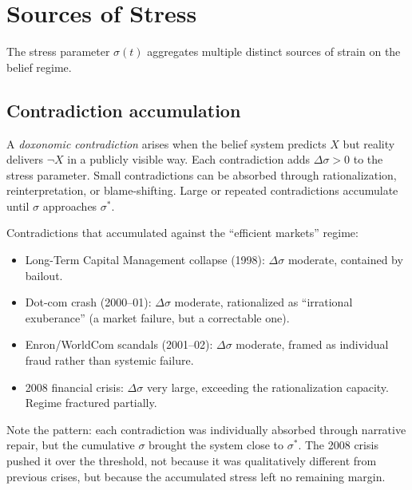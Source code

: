 \section{Sources of Stress}
\label{sec:ch30-stress}

The stress parameter $\sigma(t)$ aggregates multiple distinct sources of strain on the belief regime.

\subsection{Contradiction accumulation}

\begin{definition}
\label{def:contradiction}
A \emph{doxonomic contradiction} arises when the belief system predicts $X$ but reality delivers $\neg X$ in a publicly visible way.
Each contradiction adds $\Delta\sigma > 0$ to the stress parameter.
Small contradictions can be absorbed through rationalization, reinterpretation, or blame-shifting.
Large or repeated contradictions accumulate until $\sigma$ approaches $\sigma^*$.
\end{definition}

\begin{example}
\label{ex:contradictions}
Contradictions that accumulated against the ``efficient markets'' regime:
\begin{itemize}[nosep]
  \item Long-Term Capital Management collapse (1998): $\Delta\sigma$ moderate, contained by bailout.
  \item Dot-com crash (2000--01): $\Delta\sigma$ moderate, rationalized as ``irrational exuberance'' (a market failure, but a correctable one).
  \item Enron/WorldCom scandals (2001--02): $\Delta\sigma$ moderate, framed as individual fraud rather than systemic failure.
  \item 2008 financial crisis: $\Delta\sigma$ very large, exceeding the rationalization capacity. Regime fractured partially.
\end{itemize}
Note the pattern: each contradiction was individually absorbed through narrative repair, but the cumulative $\sigma$ brought the system close to $\sigma^*$.
The 2008 crisis pushed it over the threshold, not because it was qualitatively different from previous crises, but because the accumulated stress left no remaining margin.
\end{example}

